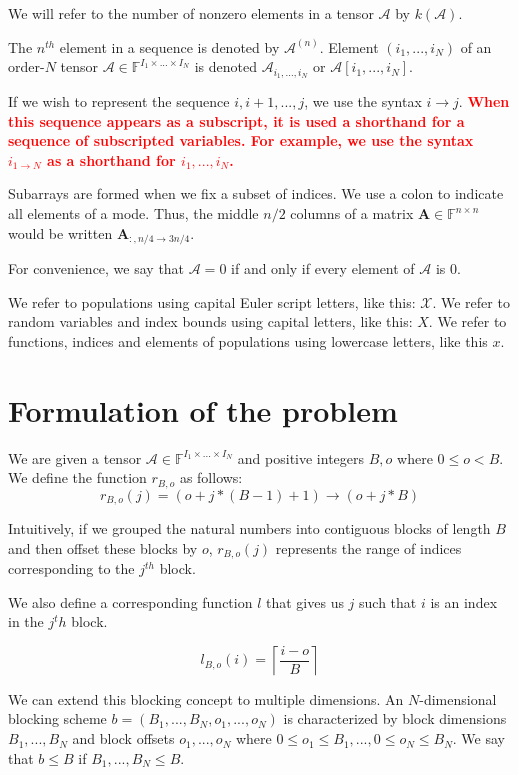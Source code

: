 \documentclass[12pt]{article}
\newcommand{\todo}[1] {\textbf{\textcolor{red}{#1}}}
\newcommand{\Mat}[1] {\mathbf{#1}}
\newcommand{\Ten}[1] {\mathbf{\mathcal{#1}}}
\newcommand{\Pop}[1] {\mathcal{#1}}
\newcommand{\F} {\mathbb{F}}
\begin{document}
    We will refer to the number of nonzero elements in a tensor $\Ten{A}$ by $k(\Ten{A})$.

    The $n^{th}$ element in a sequence is denoted by $\Ten{A}^{(n)}$.
    Element $(i_1, ..., i_N)$ of an order-$N$ tensor $\Ten{A} \in \F^{I_1 \times ... \times I_N}$ is denoted $\Ten{A}_{i_1, ..., i_N}$ or $ \Ten{A}[i_1, ..., i_N]$.

    If we wish to represent the sequence $i, i + 1, ..., j$, we use the syntax $i \to j$. \todo{When this sequence appears as a subscript, it is used a shorthand for a sequence of subscripted variables. For example, we use the syntax $i_{1 \to N}$ as a shorthand for $i_1, ..., i_N$.}

    Subarrays are formed when we fix a subset of indices. We use a colon to indicate all elements of a mode. Thus, the middle $n/2$ columns of a matrix $\Mat{A} \in \F^{n \times n}$ would be written $\Mat{A}_{:, n/4 \to 3n/4}$.

    For convenience, we say that $\Ten{A} = 0$ if and only if every element of $\Ten{A}$ is 0.

    We refer to populations using capital Euler script letters, like this: $\Pop{X}$. We refer to random variables and index bounds using capital letters, like this: $X$. We refer to functions, indices and elements of populations using lowercase letters, like this $x$.

  \section{Formulation of the problem}
    We are given a tensor $\Ten{A} \in \F^{I_1\times ...\times I_N}$ and positive integers $B, o$ where $0 \leq o < B$. We define the function $r_{B, o}$ as follows:
    \[
      r_{B, o}(j) = (o + j * (B - 1) + 1)\to(o + j * B)
    \]

    Intuitively, if we grouped the natural numbers into contiguous blocks of length $B$ and then offset these blocks by $o$, $r_{B, o}(j)$ represents the range of indices corresponding to the $j^{th}$ block.

    We also define a corresponding function $l$ that gives us $j$ such that $i$ is an index in the $j^th$ block.

    \[
      l_{B, o}(i) = \left\lceil\frac{i - o}{B}\right\rceil
    \]

    We can extend this blocking concept to multiple dimensions. An $N$-dimensional blocking scheme $b = (B_1, ..., B_N, o_1, ..., o_N)$ is characterized by block dimensions $B_1, ..., B_N$ and block offsets $o_1, ..., o_N$ where $0 \leq o_1 \leq B_1, ..., 0 \leq o_N \leq B_N$. We say that $b \leq B$ if $B_1, ..., B_N \leq B$.
\end{document}
